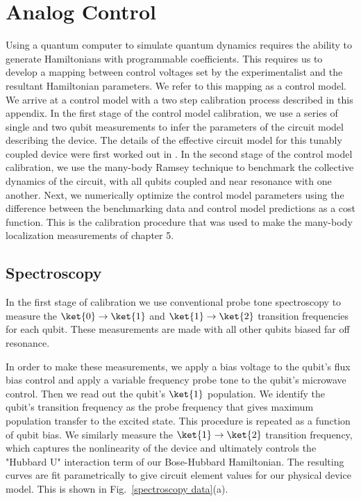 \chapter[Analog Control]{Analog Control}
\label{ch:analog_control}

Using a quantum computer to simulate quantum dynamics requires the ability to generate Hamiltonians with programmable coefficients.
This requires us to develop a mapping between control voltages set by the experimentalist and the resultant Hamiltonian parameters.
We refer to this mapping as a control model.
We arrive at a control model with a two step calibration process described in this appendix.
In the first stage of the control model calibration, we use a series of single and two qubit measurements to infer
the parameters of the circuit model describing the device.  The details of the effective circuit model for this tunably coupled device were first worked out in \cite{Neill2018}.
In the second stage of the control model calibration, we use the many-body Ramsey technique to benchmark the collective
dynamics of the circuit, with all qubits coupled and near resonance with one another.
Next, we numerically optimize the control model parameters using the difference between the benchmarking data and control model predictions as a cost function.
This is the calibration procedure that was used to make the many-body localization measurements of chapter 5.

\section{Spectroscopy \label{sec:spectroscopy}}

In the first stage of calibration we use conventional probe tone spectroscopy to measure
the $\ket{0} \rightarrow \ket{1}$ and $\ket{1} \rightarrow \ket{2}$ transition frequencies for each qubit.
These measurements are made with all other qubits biased far off resonance.

In order to make these measurements, we apply a bias voltage to the qubit's flux bias control
and apply a variable frequency probe tone to the qubit's microwave control.
Then we read out the qubit's $\ket{1}$ population.
We identify the qubit's transition frequency as the probe frequency that gives maximum population transfer to the excited state.
This procedure is repeated as a function of qubit bias.
We similarly measure the $\ket{1} \rightarrow \ket{2}$ transition frequency,
which captures the nonlinearity of the device and ultimately controls the "Hubbard U" interaction term of our Bose-Hubbard Hamiltonian.
The resulting curves are fit parametrically to give circuit element values for our physical device model.
This is shown in Fig.~\ref{spectroscopy data}(a).


